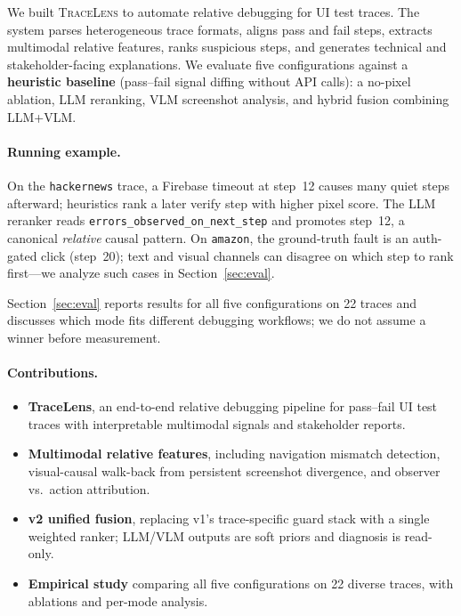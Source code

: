 \documentclass[sigconf,nonacm]{acmart}
\begin{document}
We built \textsc{TraceLens} to automate relative debugging for UI test traces.
The system parses heterogeneous trace formats, aligns pass and fail steps, extracts multimodal relative features, ranks suspicious steps, and generates technical and stakeholder-facing explanations.
We evaluate five configurations against a \textbf{heuristic baseline} (pass--fail signal diffing without API calls): a no-pixel ablation, LLM reranking, VLM screenshot analysis, and hybrid fusion combining LLM+VLM.

\paragraph{Running example.}
On the \texttt{hackernews} trace, a Firebase timeout at step~12 causes many quiet steps afterward; heuristics rank a later verify step with higher pixel score.
The LLM reranker reads \texttt{errors\_observed\_on\_next\_step} and promotes step~12, a canonical \emph{relative} causal pattern.
On \texttt{amazon}, the ground-truth fault is an auth-gated click (step~20); text and visual channels can disagree on which step to rank first---we analyze such cases in Section~\ref{sec:eval}.

Section~\ref{sec:eval} reports results for all five configurations on 22 traces and discusses which mode fits different debugging workflows; we do not assume a winner before measurement.

\paragraph{Contributions.}
\begin{itemize}
  \item \textbf{TraceLens}, an end-to-end relative debugging pipeline for pass--fail UI test traces with interpretable multimodal signals and stakeholder reports.
  \item \textbf{Multimodal relative features}, including navigation mismatch detection, visual-causal walk-back from persistent screenshot divergence, and observer vs.\ action attribution.
  \item \textbf{v2 unified fusion}, replacing v1's trace-specific guard stack with a single weighted ranker; LLM/VLM outputs are soft priors and diagnosis is read-only.
  \item \textbf{Empirical study} comparing all five configurations on 22 diverse traces, with ablations and per-mode analysis.
\end{itemize}
\end{document}
